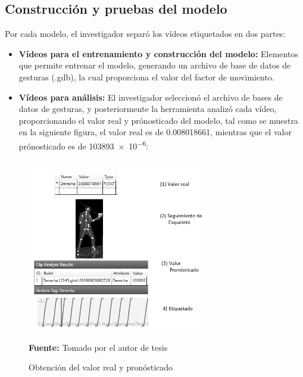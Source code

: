 \subsection{Construcci\'on y pruebas del modelo}
Por cada modelo, el investigador separ\'o los v\'ideos etiquetados en dos partes:
\begin{itemize}
\item \textbf{V\'ideos para el entrenamiento y construcci\'on del modelo:} Elementos que permite entrenar el modelo, generando un archivo de base de datos de gesturas (.gdb), la cual proporciona el valor del factor de movimiento.
\item \textbf{V\'ideos para an\'alisis:} El investigador seleccion\'o el archivo de bases de datos de gesturas, y posteriormente la herramienta analiz\'o cada v\'ideo, proporcionando el valor real y pr\'onosticado del modelo, tal como se muestra en la siguiente figura, el valor real es de 0.008018661, mientras que el valor pr\'onosticado es de \num{103893e-6}:
\end{itemize}
 \begin{figure}[H]
	\caption{Obtenci\'on del valor real y pron\'osticado}
	\label{fig:getError}
	\centering
	\includegraphics[width=300px,height=300px]{graphics/getError.png} \\
	\textbf{Fuente:} Tomado por el autor de tesis
\end{figure} 
